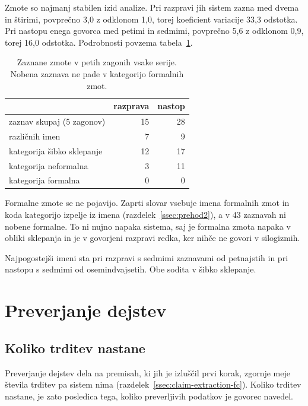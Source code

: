 \documentclass[a4paper, 12pt]{book}
\begin{document}
Zmote so najmanj stabilen izid analize. Pri razpravi jih sistem zazna med dvema
in štirimi, povprečno 3,0 z odklonom 1,0, torej koeficient variacije 33,3
odstotka. Pri nastopu enega govorca med petimi in sedmimi, povprečno 5,6 z
odklonom 0,9, torej 16,0 odstotka. Podrobnosti povzema
tabela~\ref{tbl:zmote-stabilnost}.

\begin{table}[htbp]
\centering
\begin{tabular}{lrr}
\toprule
& razprava & nastop \\
\midrule
zaznav skupaj (5 zagonov)     & 15 & 28 \\
različnih imen                & 7 & 9 \\
kategorija šibko sklepanje    & 12 & 17 \\
kategorija neformalna         & 3 & 11 \\
kategorija formalna           & 0 & 0 \\
\bottomrule
\end{tabular}
\caption{Zaznane zmote v petih zagonih vsake serije. Nobena zaznava ne pade v
kategorijo formalnih zmot.}
\label{tbl:zmote-stabilnost}
\end{table}

Formalne zmote se ne pojavijo. Zaprti slovar vsebuje imena formalnih zmot in
koda kategorijo izpelje iz imena (razdelek~\ref{ssec:prehod2}), a v 43 zaznavah
ni nobene formalne. To ni nujno napaka sistema, saj je formalna zmota napaka v
obliki sklepanja in je v govorjeni razpravi redka, ker nihče ne govori v
silogizmih.

Najpogostejši imeni sta pri razpravi  s sedmimi zaznavami od
petnajstih in pri nastopu  s sedmimi od osemindvajsetih. Obe sodita
v šibko sklepanje.

\section{Preverjanje dejstev}
\label{sec:dejstva-meritev}

\subsection{Koliko trditev nastane}
\label{ssec:koliko-trditev}

Preverjanje dejstev dela na premisah, ki jih je izluščil prvi korak, zgornje
meje števila trditev pa sistem nima (razdelek~\ref{ssec:claim-extraction-fc}).
Koliko trditev nastane, je zato posledica tega, koliko preverljivih podatkov je
govorec navedel.
\end{document}
